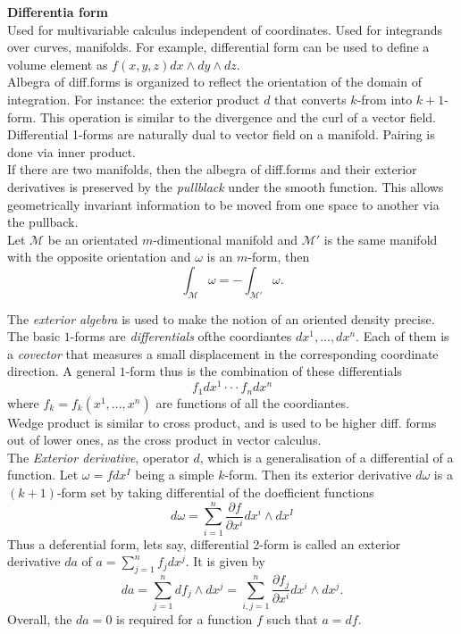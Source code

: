 \documentclass[11pt,a4paper,headinclude=true,DIV=14,BCOR=8mm,chapterprefix,listof=totoc,twoside,openright,abstracton]{scrbook}
\begin{document}
\begin{sidenote}
    \textbf{Differentia form} \\
    Used for multivariable calculus independent of coordinates. Used for integrands over curves, manifolds. For example, differential form can be used to define a volume element as $f(x,y,z)dx \wedge dy \wedge dz$.\\
    Albegra of diff.forms is organized to reflect the orientation of the domain of integration. For instance: the exterior product $d$ that converts $k$-from into $k+1$-form. This operation is similar to the divergence and the curl of a vector field. \\
    Differential 1-forms are naturally dual to vector field on a manifold. Pairing is done via inner product. \\
    If there are two manifolds, then the albegra of diff.forms and their exterior derivatives is preserved by the \textit{pullblack} under the smooth function. This allows geometrically invariant information to be moved from one space to another via the pullback. \\
    Let $\mathcal{M}$ be an orientated $m$-dimentional manifold and $\mathcal{M}'$ is the same manifold with the opposite orientation and $\omega$ is an $m$-form, then 
    \begin{equation}
        \int_{\mathcal{M}}\omega = -\int_{\mathcal{M}'}\omega.
    \end{equation}
    
    The \textit{exterior algebra} is used to make the notion of an oriented density precise.
    The basic $1$-forms are \textit{differentials} ofthe coordiantes $dx^1,...,dx^n$. Each of them is a \textit{covector} that measures a small displacement in the corresponding coordinate direction. A general $1$-form thus is the combination  of these differentials 
    \begin{equation}
        f_1dx^1\cdot\cdot\cdot f_ndx^n
    \end{equation}
    where $f_k=f_k(x^1,...,x^n)$ are functions of all the coordiantes. \\
    Wedge product is similar to cross product, and is used to be higher diff. forms out of lower ones, as the cross product in vector calculus. \\
    
    The \textit{Exterior derivative}, operator $d$, which is a generalisation of a differential of a function. Let $\omega=fdx^I$ being a simple $k$-form. Then its exterior derivative $d\omega$ is a $(k+1)$-form set by taking differential of the doefficient functions
    \begin{equation}
        d\omega = \sum_{i=1}^n \frac{\partial f}{\partial x^i}dx^i \wedge dx^I
    \end{equation}
    Thus a deferential form, lets say, differential 2-form is called an exterior derivative $da$ of $a=\sum_{j=1}^{n}f_j dx^j$. It is given by
    \begin{equation}
        da = \sum_{j=1}^n df_j \wedge dx^j = \sum_{i,j=1}^n \frac{\partial f_j}{\partial x^i}dx^i\wedge dx^j.
    \end{equation}
    Overall, the $da=0$ is required for a function $f$ such that $a=df$.
    

\end{sidenote}
\end{document}
